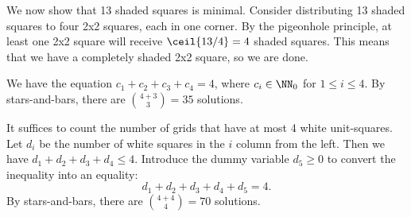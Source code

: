 \begin{solution}
\begin{ppart}
        We now show that 13 shaded squares is minimal. Consider distributing 13 shaded squares to four 2x2 squares, each in one corner. By the pigeonhole principle, at least one 2x2 square will receive $\ceil{13/4} = 4$ shaded squares. This means that we have a completely shaded 2x2 square, so we are done.
    \end{ppart}
    \begin{ppart}
        \begin{psubpart}
            We have the equation $c_1 + c_2 + c_3 + c_4 = 4$, where $c_i \in \NN_0$ for $1 \leq i \leq 4$. By stars-and-bars, there are $\binom{4+3}{3} = 35$ solutions.
        \end{psubpart}
        \begin{psubpart}
            It suffices to count the number of grids that have at most 4 white unit-squares. Let $d_i$ be the number of white squares in the $i$ column from the left. Then we have $d_1 + d_2 + d_3 + d_4 \leq 4$. Introduce the dummy variable $d_5 \geq 0$ to convert the inequality into an equality: \[d_1 + d_2 + d_3 + d_4 + d_5 = 4.\] By stars-and-bars, there are $\binom{4+4}{4} = 70$ solutions.
        \end{psubpart}
    \end{ppart}
\end{solution}

